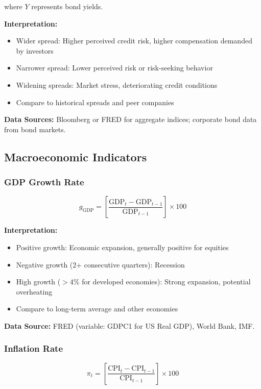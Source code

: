 \documentclass[11pt,a4paper]{article}
\begin{document}
where $Y$ represents bond yields. 

\textbf{Interpretation:}
\begin{itemize}
    \item Wider spread: Higher perceived credit risk, higher compensation demanded by investors
    \item Narrower spread: Lower perceived risk or risk-seeking behavior
    \item Widening spreads: Market stress, deteriorating credit conditions
    \item Compare to historical spreads and peer companies
\end{itemize}

\textbf{Data Sources:} Bloomberg or FRED for aggregate indices; corporate bond data from bond markets.

\subsection{Macroeconomic Indicators}

\subsubsection{GDP Growth Rate}

\begin{equation}
g_{\text{GDP}} = \left[\frac{\text{GDP}_t - \text{GDP}_{t-1}}{\text{GDP}_{t-1}}\right] \times 100
\end{equation}

\textbf{Interpretation:}
\begin{itemize}
    \item Positive growth: Economic expansion, generally positive for equities
    \item Negative growth (2+ consecutive quarters): Recession
    \item High growth ($>4\%$ for developed economies): Strong expansion, potential overheating
    \item Compare to long-term average and other economies
\end{itemize}

\textbf{Data Source:} FRED (variable: GDPC1 for US Real GDP), World Bank, IMF.

\subsubsection{Inflation Rate}

\begin{equation}
\pi_t = \left[\frac{\text{CPI}_t - \text{CPI}_{t-1}}{\text{CPI}_{t-1}}\right] \times 100
\end{equation}
\end{document}
